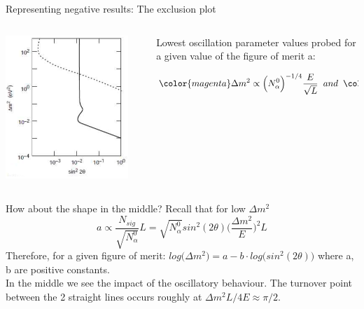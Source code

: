 %
%
%

\begin{frame}{Representing negative results: The exclusion plot}

\begin{columns}
  \begin{column}{0.25\textwidth}
    \includegraphics[width=0.90\textwidth]{./images/osc101/exclusion_plot_comments.png}
  \end{column}
  \begin{column}{0.75\textwidth}

    Lowest oscillation parameter values probed
    for a given value of the figure of merit a:

    \begin{equation*}
    {\color{magenta}
      \Delta m^{2} \propto \Big(N^{0}_{\alpha}\Big)^{-1/4} \frac{E}{\sqrt{L}}
    }
    \;\; and \;\;
    {\color{magenta}
      sin^{2} (2\theta) \propto \Big( N^{0}_{\alpha} \Big)^{-1/2} L
    }
    \end{equation*}

  \end{column}
\end{columns}

How about the shape in the middle?
Recall that for low $\Delta m^{2}$
\begin{equation*}
     a \propto \frac{N_{sig}}{\sqrt{N^{0}_{\alpha}}} L =
              \sqrt{N^{0}_{\alpha}} sin^{2} (2\theta) \Big(\frac{\Delta m^{2}}{E}\Big)^2 L
\end{equation*}
Therefore, for a given figure of merit:
{\color{magenta}
    $log\Big( \Delta m^{2} \Big) = a - b \cdot log\Big( sin^{2} (2\theta) \Big)$
}
where a, b are positive constants.\\
\vspace{0.1cm}
In the middle we see the impact of the oscillatory behaviour. The turnover point
between the 2 straight lines occurs roughly at $\Delta m^{2} L / 4E \approx \pi/2$.


\end{frame}
